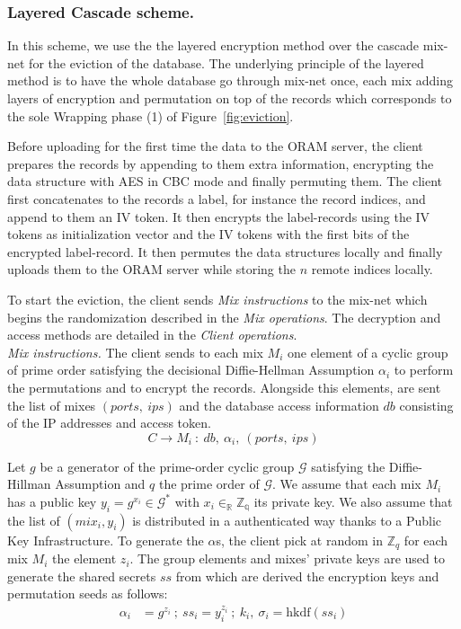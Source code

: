 \documentclass{llncs}
\begin{document}
\subsubsection{Layered Cascade scheme.}
In this scheme, we use the the layered encryption method over the cascade mix-net for the eviction of the database. The underlying principle of the layered method is to have the whole database go through mix-net once, each mix adding layers of encryption and permutation on top of the records which corresponds to the sole Wrapping phase (1) of Figure~\ref{fig:eviction}.

Before uploading for the first time the data to the ORAM server, the client prepares the records by appending to them extra information, encrypting the data structure with AES in CBC mode and finally permuting them. The client first concatenates to the records a label, for instance the record indices, and append to them an IV token. It then encrypts the label-records using the IV tokens as initialization vector and the IV tokens with the first bits of the encrypted label-record. It then permutes the data structures locally and finally uploads them to the ORAM server while storing the $n$ remote indices locally.
 
To start the eviction, the client sends \emph{Mix instructions} to the mix-net which  begins the randomization described in the \emph{Mix operations}. The decryption and access methods are detailed in the \emph{Client operations}.\\

\noindent\textit{Mix instructions.}
The client sends to each mix $M_i$ one element of a cyclic group of prime order satisfying the decisional Diffie-Hellman Assumption $\alpha_i$ to perform the permutations and to encrypt the records. Alongside this elements, are sent the list of mixes $(ports,\ ips)$ and the database access information $db$ consisting of the IP addresses and access token.
$$ C \rightarrow M_i\ :\ db,\ \alpha_{i},\ (ports,\ ips) $$

Let $g$ be a generator of the prime-order cyclic group $\mathcal{G}$ satisfying the Diffie-Hillman Assumption and $q$ the prime order of $\mathcal{G}$. We assume that each mix $M_i$ has a public key $y_i=g^{x_i}\in \mathcal{G}^*$ with $x_i \in_{\mathbb{R}} \mathbb{Z_q}$ its private key. We also assume that the list of $(mix_i, y_i)$ is distributed in a authenticated way thanks to a Public Key Infrastructure.
To generate the $\alpha$s, the client pick at random in $\mathbb{Z}_q$ for each mix $M_i$ the element $z_i$. The group elements and mixes' private keys are used to generate the shared secrets $ss$ from which are derived the encryption keys and permutation seeds as follows:
\begin{align*}
\alpha_i &= g^{z_i}\ ;\ ss_i = y_i^{z_i}\ ;\ k_i,\ \sigma_i=\text{hkdf}(ss_i)
\end{align*}
\end{document}
